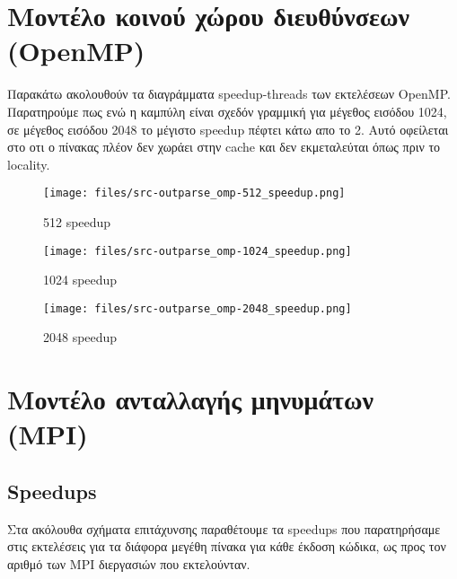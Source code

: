 







\setcounter{section}{1}


\section{Μοντέλο κοινού χώρου διευθύνσεων (\textbf{OpenMP})}
Παρακάτω ακολουθούν τα διαγράμματα speedup-threads των εκτελέσεων OpenMP.
Παρατηρούμε πως ενώ η καμπύλη είναι σχεδόν γραμμική για μέγεθος εισόδου 1024,
σε μέγεθος εισόδου 2048 το μέγιστο speedup πέφτει κάτω απο το 2. Αυτό οφείλεται
στο οτι ο πίνακας πλέον δεν χωράει στην cache και δεν εκμεταλεύται όπως πριν το
locality.

\begin{figure}[H]
    \centering
    \texttt{[image: files/src-outparse\_omp-512\_speedup.png]}
    \caption{512 speedup}
    \label{fig:omp_512_speed} \end{figure}

\begin{figure}[H]
    \centering
    \texttt{[image: files/src-outparse\_omp-1024\_speedup.png]}
    \caption{1024 speedup}
    \label{fig:omp_1024_speed}
\end{figure}

\begin{figure}[H]
    \centering
    \texttt{[image: files/src-outparse\_omp-2048\_speedup.png]}
    \caption{2048 speedup}
    \label{fig:omp_2048_speed}
\end{figure}




\pagebreak

\section{Μοντέλο ανταλλαγής μηνυμάτων (\textbf{MPI})}

\subsection{Speedups}

Στα ακόλουθα σχήματα επιτάχυνσης παραθέτουμε τα speedups που παρατηρήσαμε στις
εκτελέσεις για τα διάφορα μεγέθη πίνακα για κάθε έκδοση κώδικα, ως προς τον
αριθμό των MPI διεργασιών που εκτελούνταν.

